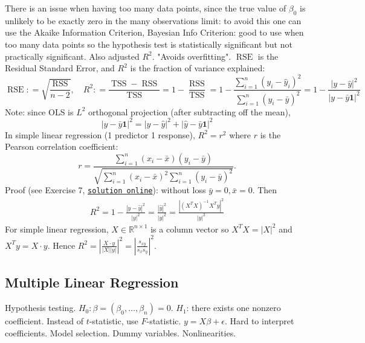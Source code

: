 \documentclass[11pt]{article}
\newcommand{\coloneq}{\mathrel{\mathop:}=}
\theoremstyle{definition}
\newcommand{\R}{\mathbb R}
\newcommand{\RSS}{\operatorname{RSS}}
\newcommand{\RSE}{\operatorname{RSE}}
\newcommand{\TSS}{\operatorname{TSS}}
\newcommand{\myhref}[2]{\href{#1}{\texttt{#2}}}
\begin{document}
There is an issue when having too many data points, since the true value of $\beta_0$ is unlikely to be exactly zero in the many observations limit: to avoid this one can use the Akaike Information Criterion, Bayesian Info Criterion: good to use when too many data points so the hypothesis test is statistically significant but not practically significant. Also adjusted $R^2$. "Avoids overfitting".
$\RSE $ is the Residual Standard Error, and $R^2$ is the fraction of variance explained:
\[ \RSE \coloneq \sqrt{\frac{\RSS}{n-2}}, \quad R^2 \coloneq \frac{\TSS - \RSS}{\TSS} = 1 - \frac{\RSS}{\TSS} = 1 - \frac{\sum_{i=1}^n (y_i - \hat y_i)^2}{\sum_{i=1}^n (y_i - \bar y)^2} = 1 - \frac{|y-\hat y|^2}{|y-\bar y \mathbf 1|^2}\]
Note: since OLS is $L^2$ orthogonal projection (after subtracting off the mean),
\[ |y-\bar y \mathbf 1|^2 = |y-\hat y|^2 + |\hat y-\bar y \mathbf 1|^2  \]
In simple linear regression (1 predictor 1 response), $R^2=r^2$ where $r$ is the Pearson correlation coefficient:
\[r = \frac{\sum_{i=1}^n (x_i - \bar x) (y_i - \bar y)}{\sqrt{\sum_{i=1}^n (x_i - \bar x)^2 \sum_{i=1}^n (y_i - \bar y)^2}}.\]
Proof (see Exercise 7, \myhref{https://github.com/botlnec/islp/blob/master/docs/sols/chapter3/exercise7.md}{solution online}): without loss $\bar y=0, \bar x = 0$. Then
\begin{align*}
R^2 
= 1 - \frac{|y-\hat y|^2}{|y|^2}  
= \frac{|\hat y|^2}{|y|^2}  
= \frac{|(X^T X)^{-1} X^T y|^2}{|y|^2} 
\end{align*}
For simple linear regression, $X\in \R^{n\times 1}$ is a column vector so $X^TX = |X|^2$ and $X^Ty = X\cdot y$. Hence 
$R^2 = \left|\frac{X\cdot y}{|X| |y|}\right|^2 = \left|\frac{s_{xy}}{s_x s_y}\right|^2$.
\subsection{Multiple Linear Regression}
Hypothesis testing. $H_0: \beta = (\beta_0,\dots,\beta_n)=0$. $H_1$: there exists one nonzero coefficient. Instead of $t$-statistic, use $F$-statistic.
$y = X\beta + \epsilon$.
Hard to interpret coefficients. Model selection. Dummy variables. Nonlinearities.
\end{document}
